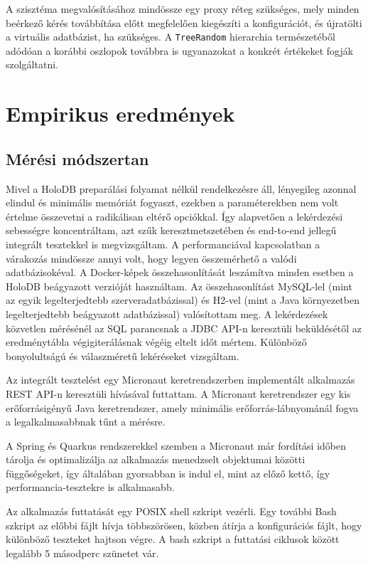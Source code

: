 \documentclass[
    parspace,
    noindent,
    nohyp,
]{elteiktdk}[2023/04/10]
\newcommand{\todoref}[1]{\todo[inline, noinlinepar, color=red, textcolor=white, inlinewidth=0.6cm, caption={#1}]{\large \textbf{×}}}
\begin{document}
A szisztéma megvalósításához mindössze egy proxy réteg szükséges,
mely minden beérkező kérés továbbítása előtt megfelelően kiegészíti a konfigurációt,
és újratölti a virtuális adatbázist, ha szükséges.
A \texttt{TreeRandom} hierarchia természetéből adódóan a korábbi oszlopok
továbbra is ugyanazokat a konkrét értékeket fogják szolgáltatni.


\section{Empirikus eredmények}

\subsection{Mérési módszertan}

Mivel a HoloDB preparálási folyamat nélkül rendelkezésre áll,
lényegileg azonnal elindul és minimális memóriát fogyaszt,
ezekben a paraméterekben nem volt értelme összevetni
a radikálisan eltérő opciókkal.
Így alapvetően a lekérdezési sebességre koncentráltam,
azt szűk keresztmetszetében és end-to-end jellegű integrált tesztekkel is megvizsgáltam.
A performanciával kapcsolatban a várakozás mindössze annyi volt,
hogy legyen összemérhető a valódi adatbázisokéval.
A Docker-képek összehasonlítását leszámítva minden esetben
a HoloDB beágyazott verzióját használtam.
Az összehasonlítást MySQL-lel (mint az egyik legelterjedtebb szerveradatbázissal)
és H2-vel (mint a Java környezetben legelterjedtebb beágyazott adatbázissal) valósítottam meg.
A lekérdezések közvetlen mérésénél az SQL parancsnak a JDBC API-n keresztüli beküldésétől
az eredménytábla végigiterálásnak végéig eltelt időt mértem.
Különböző bonyolultságú és válaszméretű lekéréseket vizsgáltam.
\todoref{Mérések: a mérési környezetet leírni, JMH stb.}

Az integrált tesztelést egy Micronaut keretrendszerben implementált
alkalmazás REST API-n keresztüli hívásával futtattam.
A Micronaut keretrendszer egy kis erőforrásigényű Java keretrendszer,
amely minimális erőforrás-lábnyománál fogva a legalkalmasabbnak tűnt a mérésre.

A Spring és Quarkus rendszerekkel szemben a Micronaut már fordítási időben
tárolja és optimalizálja az alkalmazás menedzselt objektumai közötti függőségeket,
így általában gyorsabban is indul el, mint az előző kettő,
így performancia-tesztekre is alkalmasabb.

Az alkalmazás futtatását egy POSIX shell szkript vezérli.
Egy további Bash szkript az előbbi fájlt hívja többszörösen,
közben átírja a konfigurációs fájlt, hogy különböző teszteket hajtson végre.
A bash szkript a futtatási ciklusok között legalább 5 másodperc szünetet vár.
\end{document}
